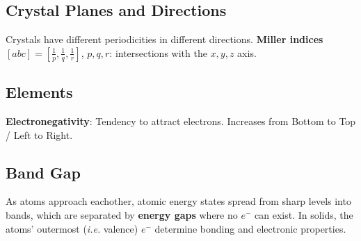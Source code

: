 \documentclass[a4paper, fontsize=8pt, landscape, DIV=1]{scrartcl}
\begin{document}
\begin{multicols*}{4}
  \subsection{Crystal Planes and Directions}
  Crystals have different periodicities in different directions.
  \textbf{Miller indices} $[abc] = \left[\frac{1}{p},\frac{1}{q},\frac{1}{r}\right]$, $p,q,r$: intersections with the $x,y,z$ axis.

  \subsection{Elements}
  \textbf{Electronegativity}: Tendency to attract electrons. Increases from Bottom to Top / Left to Right.


  \subsection{Band Gap}
  As atoms approach eachother, atomic energy states spread from sharp levels into bands, which are separated by \textbf{energy gaps} where no $e^-$ can exist.
  In solids, the atoms' outermost (\textit{i.e.} valence) $e^-$ determine bonding and electronic properties.


\end{multicols*}
\end{document}
